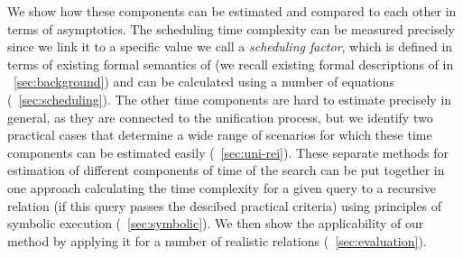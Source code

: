 We show how these components can be estimated and compared to each other in terms of asymptotics. The scheduling time complexity can be measured precisely since we link it to a specific value we call a
\emph{scheduling factor}, which is defined in terms of existing formal semantics of \mK (we recall existing formal descriptions of \mK in \sectionword~\ref{sec:background}) and can be calculated using
a number of equations (\sectionword~\ref{sec:scheduling}). The other time components are hard to estimate precisely in general, as they are connected to the unification process, but we identify two
practical cases that determine a wide range of scenarios for which these time components can be estimated easily (\sectionword~\ref{sec:uni-rei}). These separate methods for estimation of
different components of time of the search can be put together in one approach calculating the time complexity for a given query to a recursive relation (if this query passes the descibed
practical criteria) using principles of symbolic execution (\sectionword~\ref{sec:symbolic}). We then show the applicability of our method by applying it for a number of realistic \mK relations (\sectionword~\ref{sec:evaluation}).
